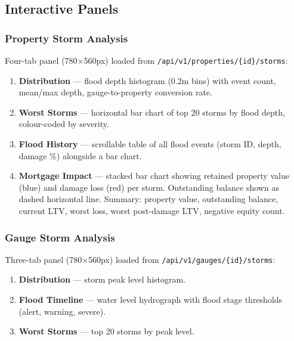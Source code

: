 \documentclass[11pt,a4paper]{article}
\begin{document}
\subsection{Interactive Panels}

\subsubsection{Property Storm Analysis}
\label{sec:prop_storm}

Four-tab panel (780$\times$560px) loaded from
\texttt{/api/v1/properties/\{id\}/storms}:

\begin{enumerate}[nosep]
    \item \textbf{Distribution} --- flood depth histogram (0.2m bins) with
          event count, mean/max depth, gauge-to-property conversion rate.
    \item \textbf{Worst Storms} --- horizontal bar chart of top 20 storms by
          flood depth, colour-coded by severity.
    \item \textbf{Flood History} --- scrollable table of all flood events
          (storm ID, depth, damage \%) alongside a bar chart.
    \item \textbf{Mortgage Impact} --- stacked bar chart showing retained
          property value (blue) and damage loss (red) per storm. Outstanding
          balance shown as dashed horizontal line. Summary: property value,
          outstanding balance, current LTV, worst loss, worst post-damage LTV,
          negative equity count.
\end{enumerate}

\subsubsection{Gauge Storm Analysis}

Three-tab panel (780$\times$560px) loaded from
\texttt{/api/v1/gauges/\{id\}/storms}:

\begin{enumerate}[nosep]
    \item \textbf{Distribution} --- storm peak level histogram.
    \item \textbf{Flood Timeline} --- water level hydrograph with flood stage
          thresholds (alert, warning, severe).
    \item \textbf{Worst Storms} --- top 20 storms by peak level.
\end{enumerate}
\end{document}

